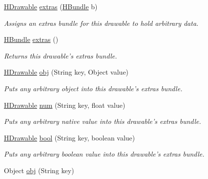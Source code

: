 \begin{DoxyCompactItemize}
\item 
\hyperlink{classhype_1_1core_1_1drawable_1_1_h_drawable}{H\-Drawable} \hyperlink{classhype_1_1core_1_1drawable_1_1_h_drawable_ab25de02ec7eb6cd806ab7fb9f9f6150f}{extras} (\hyperlink{classhype_1_1core_1_1util_1_1_h_bundle}{H\-Bundle} b)
\begin{DoxyCompactList}\small\item\em Assigns an {\itshape extras bundle} for this drawable to hold arbitrary data. \end{DoxyCompactList}\item 
\hyperlink{classhype_1_1core_1_1util_1_1_h_bundle}{H\-Bundle} \hyperlink{classhype_1_1core_1_1drawable_1_1_h_drawable_a3111c7ead30122880433c3244be5680a}{extras} ()
\begin{DoxyCompactList}\small\item\em Returns this drawable's {\itshape extras bundle}. \end{DoxyCompactList}\item 
\hyperlink{classhype_1_1core_1_1drawable_1_1_h_drawable}{H\-Drawable} \hyperlink{classhype_1_1core_1_1drawable_1_1_h_drawable_a6cf0a0516360437ff2d404ba9f89e565}{obj} (String key, Object value)
\begin{DoxyCompactList}\small\item\em Puts any arbitrary object into this drawable's {\itshape extras bundle}. \end{DoxyCompactList}\item 
\hyperlink{classhype_1_1core_1_1drawable_1_1_h_drawable}{H\-Drawable} \hyperlink{classhype_1_1core_1_1drawable_1_1_h_drawable_afb065431d9ff439c42b82cab8ff2d7db}{num} (String key, float value)
\begin{DoxyCompactList}\small\item\em Puts any arbitrary native value into this drawable's {\itshape extras bundle}. \end{DoxyCompactList}\item 
\hyperlink{classhype_1_1core_1_1drawable_1_1_h_drawable}{H\-Drawable} \hyperlink{classhype_1_1core_1_1drawable_1_1_h_drawable_a5df0b54383b13fd0d121d78af53b125a}{bool} (String key, boolean value)
\begin{DoxyCompactList}\small\item\em Puts any arbitrary boolean value into this drawable's {\itshape extras bundle}. \end{DoxyCompactList}\item 
Object \hyperlink{classhype_1_1core_1_1drawable_1_1_h_drawable_a014b66534bafbca10e5d8337c644b30a}{obj} (String key)

\end{DoxyCompactItemize}
